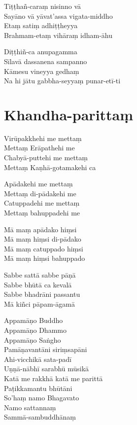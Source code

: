 \begin{paritta}
Tiṭṭhañ-caraṃ nisinno vā\\
Sayāno vā yāvat'assa vigata-middho\\
Etaṃ satiṃ adhiṭṭheyya\\
Brahmam-etaṃ vihāraṃ idham-āhu

\enlargethispage{\baselineskip}

Diṭṭhiñ-ca anupagamma\\
Sīlavā dassanena sampanno\\
Kāmesu vineyya gedhaṃ\\
Na hi jātu gabbha-seyyaṃ punar-etī-ti

\end{paritta}

\chapter{Khandha-parittaṃ}%


\begin{paritta}
Virūpakkhehi me mettaṃ\\
Mettaṃ Erāpathehi me\\
Chabyā-puttehi me mettaṃ\\
Mettaṃ Kaṇhā-gotamakehi ca

Apādakehi me mettaṃ\\
Mettaṃ di-pādakehi me\\
Catuppadehi me mettaṃ\\
Mettaṃ bahuppadehi me

Mā maṃ apādako hiṃsi\\
Mā maṃ hiṃsi di-pādako\\
Mā maṃ catuppado hiṃsi\\
Mā maṃ hiṃsi bahuppado

Sabbe sattā sabbe pāṇā\\
Sabbe bhūtā ca kevalā\\
Sabbe bhadrāni passantu\\
Mā kiñci pāpam-āgamā

Appamāṇo Buddho\\
Appamāṇo Dhammo\\
Appamāṇo Saṅgho\\
Pamāṇavantāni siriṃsapāni\\
Ahi-vicchikā sata-padī\\
Uṇṇā-nābhī sarabhū mūsikā\\
Katā me rakkhā katā me parittā\\
Paṭikkamantu bhūtāni\\
So'haṃ namo Bhagavato\\
Namo sattannaṃ\\
Sammā-sambuddhānaṃ

\end{paritta}

